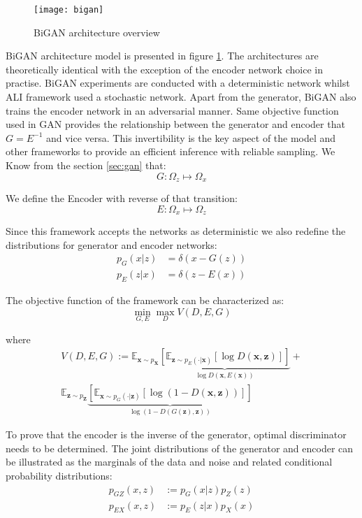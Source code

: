 \begin{figure}[h!]
	\centering
	\texttt{[image: bigan]}
    \caption{BiGAN architecture overview}
    \label{fig:bigan_model}
\end{figure}

BiGAN architecture model is presented in figure \ref{fig:bigan_model}. The architectures are
theoretically identical with the exception of the encoder network choice in practise. BiGAN
experiments are conducted with a deterministic network whilst ALI framework used a stochastic
network. Apart from the generator, BiGAN also trains the encoder network in an adversarial manner.
Same objective function used in GAN provides the relationship between the generator and encoder that
$G = E^{-1}$ and vice versa. This invertibility is the key aspect of the model and other
frameworks to provide an efficient inference with reliable sampling. We Know from the section
\ref{sec:gan} that: 
$$
G : \Omega_{z} \mapsto \Omega_{x}
$$

We define the Encoder with reverse of that transition:
$$
E : \Omega_{x} \mapsto \Omega_{z}
$$

Since this framework accepts the networks as deterministic we also redefine the distributions for
generator and encoder networks:
\begin{align*}
    p_G(x | z) & = \delta (x - G(z)) \\
    p_E(z | x) & = \delta (z - E(x))
\end{align*}

The objective function of the framework can be characterized as:
\begin{equation}
    \min _{G, E} \max _{D} V(D, E, G)
\end{equation}
 
where
\begin{multline}
    \label{eqn:bigan_v}
V(D, E, G) :=\mathbb{E}_{\mathbf{x} \sim p_{\mathbf{X}}}  \underbrace{\left[ \mathbb{E}_{\mathbf{z} \sim p_{E}(\cdot | \mathbf{x})}[\log D(\mathbf{x}, \mathbf{z})] \right]}_{\log D(\mathbf{x}, E(\mathbf{x}))} + \\ \mathbb{E}_{\mathbf{z} \sim p_{\mathbf{Z}}} \underbrace{  \left[ \mathbb{E}_{\mathbf{x} \sim p_{G}(\cdot | \mathbf{z})}[\log (1-D(\mathbf{x}, \mathbf{z}))] \right]}_{\log (1-D(G(\mathbf{z}), \mathbf{z}))}
\end{multline}

To prove that the encoder is the inverse of the generator, optimal discriminator needs to be
determined.\cite{Donahue2017AdversarialFL} The joint distributions of the generator and encoder can
be illustrated as the marginals of the data and noise and related conditional probability
distributions:
\begin{align}
    \label{eqn:bigan_gz}
    p_{GZ} (x, z ) &:= p_G(x | z) p_{Z} (z) \\[5pt] 
    \label{eqn:bigan_ex}
    p_{EX} (x, z ) &:= p_E(z | x) p_{X} (x) 
\end{align}

